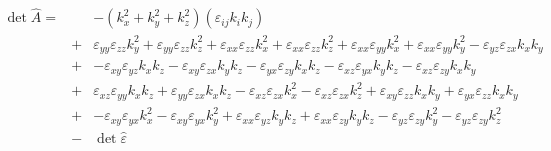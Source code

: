 \documentclass[12pt,a4paper,twoside,openright,BCOR10mm,headsepline,titlepage,abstracton,chapterprefix,final]{scrreprt}
\newcommand\wavenumber{k}
\newcommand\Tensor[1]{\hat{#1}}
\newcommand\permittivity{\Tensor{\scalarpermittivity}}
\newcommand\scalarpermittivity{\varepsilon}
\begin{document}
\begin{eqnarray}
 \det \hat{A} =&& 
   - ( \wavenumber_x^2 + \wavenumber_y^2 + \wavenumber_z^2 )
     ( \scalarpermittivity_{ij} \wavenumber_i \wavenumber_j )
 \nonumber\\
 &+& 
       \scalarpermittivity_{yy} \scalarpermittivity_{zz} \wavenumber_y^2 
    +  \scalarpermittivity_{yy} \scalarpermittivity_{zz} \wavenumber_z^2 
    +  \scalarpermittivity_{xx} \scalarpermittivity_{zz} \wavenumber_x^2 + \scalarpermittivity_{xx} \scalarpermittivity_{zz} \wavenumber_z^2 + \scalarpermittivity_{xx} \scalarpermittivity_{yy} \wavenumber_x^2 + \scalarpermittivity_{xx} \scalarpermittivity_{yy} \wavenumber_y^2 
    -  \scalarpermittivity_{yz} \scalarpermittivity_{zx} \wavenumber_x \wavenumber_y 
 \nonumber\\&+&
    -  \scalarpermittivity_{xy} \scalarpermittivity_{yz} \wavenumber_x \wavenumber_z - \scalarpermittivity_{xy} \scalarpermittivity_{zx} \wavenumber_y \wavenumber_z  
    -  \scalarpermittivity_{yx} \scalarpermittivity_{zy} \wavenumber_x \wavenumber_z  
    -  \scalarpermittivity_{xz} \scalarpermittivity_{yx} \wavenumber_y \wavenumber_z - \scalarpermittivity_{xz} \scalarpermittivity_{zy} \wavenumber_x \wavenumber_y  
 \nonumber\\&+&
       \scalarpermittivity_{xz} \scalarpermittivity_{yy} \wavenumber_x \wavenumber_z + \scalarpermittivity_{yy} \scalarpermittivity_{zx} \wavenumber_x \wavenumber_z 
    -  \scalarpermittivity_{xz} \scalarpermittivity_{zx} \wavenumber_x^2 
    -  \scalarpermittivity_{xz} \scalarpermittivity_{zx} \wavenumber_z^2 
    +  \scalarpermittivity_{xy} \scalarpermittivity_{zz} \wavenumber_x \wavenumber_y + \scalarpermittivity_{yx} \scalarpermittivity_{zz} \wavenumber_x \wavenumber_y 
 \nonumber\\&+&
    -  \scalarpermittivity_{xy} \scalarpermittivity_{yx} \wavenumber_x^2 
    -  \scalarpermittivity_{xy} \scalarpermittivity_{yx} \wavenumber_y^2 
    +  \scalarpermittivity_{xx} \scalarpermittivity_{yz} \wavenumber_y \wavenumber_z + \scalarpermittivity_{xx} \scalarpermittivity_{zy} \wavenumber_y \wavenumber_z  
    -  \scalarpermittivity_{yz} \scalarpermittivity_{zy} \wavenumber_y^2 
    -  \scalarpermittivity_{yz} \scalarpermittivity_{zy} \wavenumber_z^2 
 \nonumber\\[2ex]
 &-& \det \permittivity 
\end{eqnarray}
\end{document}
